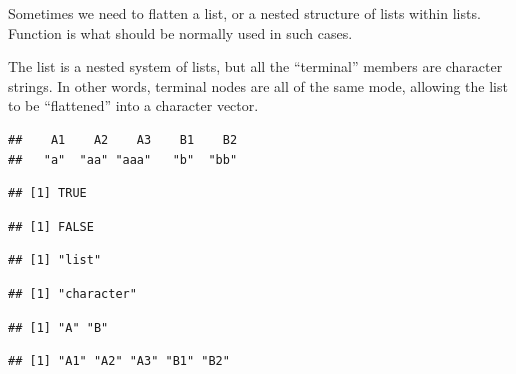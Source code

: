 \documentclass[krantz2]{krantz}\usepackage{knitr}
\begin{document}
Sometimes we need to flatten a list, or a nested structure of lists within lists. Function  is what should be normally used in such cases.

The list  is a nested system of lists, but all the ``terminal'' members are character strings. In other words, terminal nodes are all of the same mode, allowing the list to be ``flattened'' into a character vector.

\begin{knitrout}\footnotesize
{}\color{fgcolor}\begin{kframe}
\begin{alltt}
 \hlkwb{<-} \hlstd{(} \hlstd{=} \hlstd{(}\hlstd{,} \hlstd{,} \hlstd{),}  \hlstd{=} \hlstd{(}\hlstd{,} \hlstd{))}
 \hlkwb{<-} 
\end{alltt}
\begin{verbatim}
##    A1    A2    A3    B1    B2 
##   "a"  "aa" "aaa"   "b"  "bb"
\end{verbatim}
\begin{alltt}
\end{alltt}
\begin{verbatim}
## [1] TRUE
\end{verbatim}
\begin{alltt}
\end{alltt}
\begin{verbatim}
## [1] FALSE
\end{verbatim}
\begin{alltt}
\end{alltt}
\begin{verbatim}
## [1] "list"
\end{verbatim}
\begin{alltt}
\end{alltt}
\begin{verbatim}
## [1] "character"
\end{verbatim}
\begin{alltt}
\end{alltt}
\begin{verbatim}
## [1] "A" "B"
\end{verbatim}
\begin{alltt}
\end{alltt}
\begin{verbatim}
## [1] "A1" "A2" "A3" "B1" "B2"
\end{verbatim}
\end{kframe}
\end{knitrout}
\end{document}
